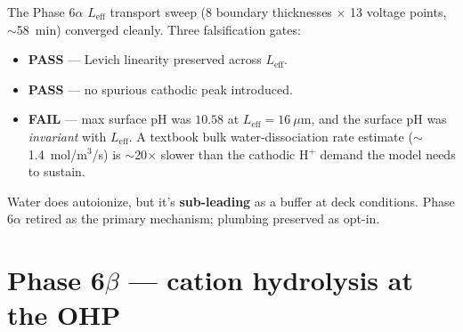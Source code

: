 \documentclass[11pt]{article}
\begin{document}

The Phase 6$\alpha$ $L_{\mathrm{eff}}$ transport sweep (8 boundary
thicknesses $\times$ 13 voltage points, $\sim$58~min) converged
cleanly.  Three falsification gates:

\begin{itemize}\setlength{\itemsep}{1pt}
\item[\textbf{P1}] \textcolor{success}{\textbf{PASS}} ---
  Levich linearity preserved across $L_{\mathrm{eff}}$.
\item[\textbf{P2}] \textcolor{success}{\textbf{PASS}} ---
  no spurious cathodic peak introduced.
\item[\textbf{P3}] \textcolor{verdict}{\textbf{FAIL}} ---
  max surface pH was $10.58$ at $L_{\mathrm{eff}}=16~\mu$m, and the
  surface pH was \emph{invariant} with $L_{\mathrm{eff}}$.  A
  textbook bulk water-dissociation rate estimate
  ($\sim$1.4~mol/m$^3$/s) is $\sim$20$\times$ slower than the
  cathodic H$^+$ demand the model needs to sustain.
\end{itemize}

Water does autoionize, but it's \textbf{sub-leading} as a buffer at
deck conditions.  Phase 6$\alpha$ retired as the primary mechanism;
plumbing preserved as opt-in.

\section{Phase 6$\beta$ --- cation hydrolysis at the OHP}
\end{document}
